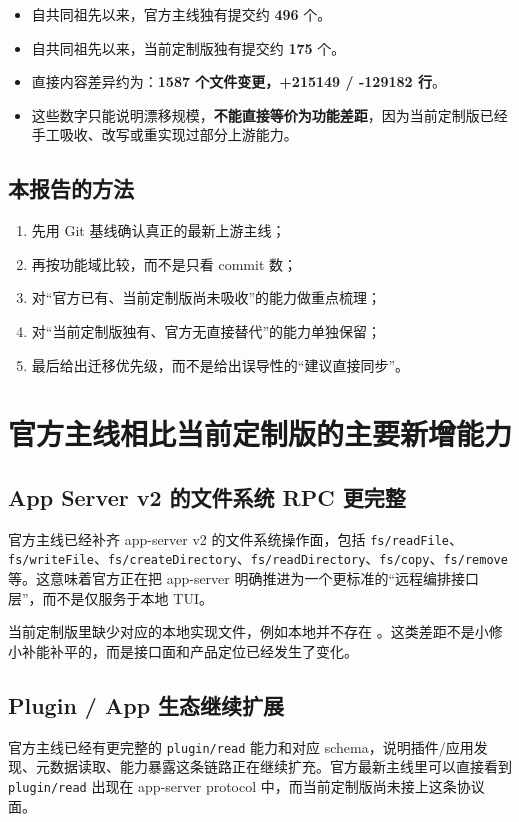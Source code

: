 \documentclass[UTF8,11pt]{ctexart}
\begin{document}
\begin{itemize}[nosep]
  \item 自共同祖先以来，官方主线独有提交约 \textbf{496} 个。
  \item 自共同祖先以来，当前定制版独有提交约 \textbf{175} 个。
  \item 直接内容差异约为：\textbf{1587 个文件变更，+215149 / -129182 行}。
  \item 这些数字只能说明漂移规模，\textbf{不能直接等价为功能差距}，因为当前定制版已经手工吸收、改写或重实现过部分上游能力。
\end{itemize}

\subsection{本报告的方法}
\begin{enumerate}[nosep]
  \item 先用 Git 基线确认真正的最新上游主线；
  \item 再按功能域比较，而不是只看 commit 数；
  \item 对“官方已有、当前定制版尚未吸收”的能力做重点梳理；
  \item 对“当前定制版独有、官方无直接替代”的能力单独保留；
  \item 最后给出迁移优先级，而不是给出误导性的“建议直接同步”。
\end{enumerate}

\section{官方主线相比当前定制版的主要新增能力}

\subsection{App Server v2 的文件系统 RPC 更完整}
官方主线已经补齐 app-server v2 的文件系统操作面，包括 \texttt{fs/readFile}、\texttt{fs/writeFile}、\texttt{fs/createDirectory}、\texttt{fs/readDirectory}、\texttt{fs/copy}、\texttt{fs/remove} 等。这意味着官方正在把 app-server 明确推进为一个更标准的“远程编排接口层”，而不是仅服务于本地 TUI。

当前定制版里缺少对应的本地实现文件，例如本地并不存在 。这类差距不是小修小补能补平的，而是接口面和产品定位已经发生了变化。

\subsection{Plugin / App 生态继续扩展}
官方主线已经有更完整的 \texttt{plugin/read} 能力和对应 schema，说明插件/应用发现、元数据读取、能力暴露这条链路正在继续扩充。官方最新主线里可以直接看到 \texttt{plugin/read} 出现在 app-server protocol 中，而当前定制版尚未接上这条协议面。
\end{document}
